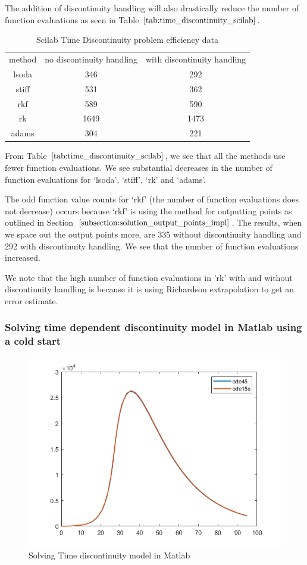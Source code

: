 The addition of discontinuity handling will also drastically reduce the number of function evaluations as seen in Table $\ref{tab:time_discontinuity_scilab}$.

\begin{table}[h]
\caption {Scilab Time Discontinuity problem efficiency data} 
\label{tab:time_discontinuity_scilab} 
\begin{center}
\begin{tabular}{ c c c }
method & no discontinuity handling & with discontinuity handling \\ 
lsoda & 346 & 292 \\
stiff & 531 & 362 \\
rkf & 589 & 590 \\
rk & 1649 & 1473 \\
adams & 304 & 221 \\
\end{tabular}
\end{center}
\end{table}

From Table $\ref{tab:time_discontinuity_scilab}$, we see that all the methods use fewer function evaluations. We see substantial decreases in the number of function evaluations for `lsoda', `stiff', `rk' and `adams'.

The odd function value counts for `rkf' (the number of function evaluations does not decrease) occurs because `rkf' is using the method for outputting points as outlined in Section $\ref{subsection:solution_output_points_impl}$. The results, when we space out the output points more, are 335 without discontinuity handling and 292 with discontinuity handling. We see that the number of function evaluations increased.

We note that the high number of function evaluations in 'rk' with and without discontinuity handling is because it is using Richardson extrapolation to get an error estimate.

\subsubsection{Solving time dependent discontinuity model in Matlab using a cold start}
\begin{figure}[h]
\centering
\includegraphics[width=0.7\linewidth]{./figures/solve_time_discontinuity_matlab}
\caption{Solving Time discontinuity model in Matlab}
\label{fig:solve_time_discontinuity_matlab}
\end{figure}


